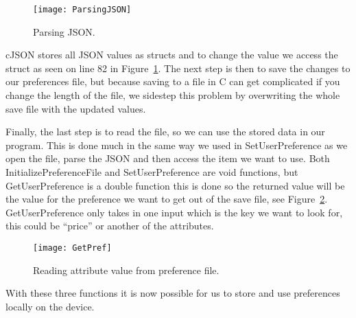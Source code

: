 \begin{figure}
    \centering
    \texttt{[image: ParsingJSON]}
    \caption{Parsing JSON.}
    \label{fig:figureParsingJSON}
\end{figure}

cJSON stores all JSON values as structs and to change the value we access the struct as seen on line 82 in
Figure~\ref{fig:figureParsingJSON}.
The next step is then to save the changes to our preferences file, but because saving to a file in C can get
complicated if you change the length of the file, we sidestep this problem by overwriting the whole save file with the
updated values.

Finally, the last step is to read the file, so we can use the stored data in our program.
This is done much in the same way we used in SetUserPreference as we open the file, parse the JSON and then access
the item we want to use.
Both InitializePreferenceFile and SetUserPreference are void functions, but GetUserPreference is a double function
this is done so the returned value will be the value for the preference we want to get out of the save file, see
Figure~\ref{fig:figureGetPref}.
GetUserPreference only takes in one input which is the key we want to look for, this could be ``price'' or another of
the attributes.

\begin{figure}
    \centering
    \texttt{[image: GetPref]}
    \caption{Reading attribute value from preference file.}
    \label{fig:figureGetPref}
\end{figure}

With these three functions it is now possible for us to store and use preferences locally on the device.
